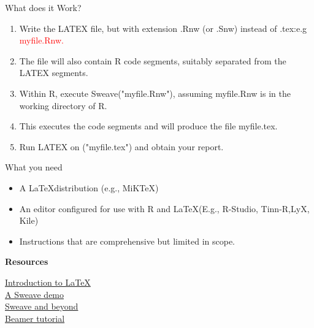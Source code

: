 \documentclass[xcolor=dvipsnames]{beamer}
\begin{document}
\begin{frame}{What does it Work?}
\begin{enumerate}
\item Write the LATEX file, but with extension .Rnw (or .Snw) instead of .tex:e.g \textcolor{red}{myfile.Rnw.}
\item The file will also contain  R code segments, suitably separated from the LATEX segments. 
 \item Within R, execute Sweave("myfile.Rnw"), assuming myfile.Rnw is in the working directory
of R.
\item This executes the code segments and will produce the file myfile.tex. 
\item  Run LATEX on ("myfile.tex") and obtain your report. 
\end{enumerate}

\end{frame}


\begin{frame}{What you need}

\begin{itemize}

\item A \LaTeX distribution (e.g., MiKTeX)
\item An editor configured for use with R and \LaTeX (E.g., R-Studio, Tinn-R,LyX, Kile) 
\item Instructions that are comprehensive but limited in scope.


\end{itemize}


\end{frame}




\begin{frame}[fragile]{\textbf{Resources}}



\href{http://en.wikibooks.org/wiki/LaTeX/Introduction}{Introduction to LaTeX} \\
\href{http://www.stat.umn.edu/~charlie/Sweave}{A Sweave demo} \\
\href{http://www.ci.tuwien.ac.at/~leisch/Sweave}{Sweave and beyond}\\
\href{http://www.uncg.edu/cmp/reu/presentations/Charles%20Batts%20-%20Beamer%20Tutorial.pdf}{Beamer tutorial}

\end{frame}
\end{document}
